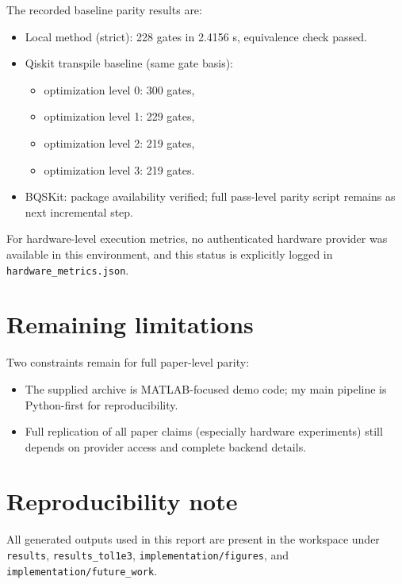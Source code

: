 \documentclass[11pt,a4paper]{article}
\begin{document}
The recorded baseline parity results are:
\begin{itemize}
    \item Local method (strict): 228 gates in 2.4156 s, equivalence check passed.
    \item Qiskit transpile baseline (same gate basis):
    \begin{itemize}
        \item optimization level 0: 300 gates,
        \item optimization level 1: 229 gates,
        \item optimization level 2: 219 gates,
        \item optimization level 3: 219 gates.
    \end{itemize}
    \item BQSKit: package availability verified; full pass-level parity script remains as next incremental step.
\end{itemize}

For hardware-level execution metrics, no authenticated hardware provider was available in this environment, and this status is explicitly logged in \texttt{hardware\_metrics.json}.

\section{Remaining limitations}
Two constraints remain for full paper-level parity:
\begin{itemize}
    \item The supplied archive is MATLAB-focused demo code; my main pipeline is Python-first for reproducibility.
    \item Full replication of all paper claims (especially hardware experiments) still depends on provider access and complete backend details.
\end{itemize}

\section*{Reproducibility note}
All generated outputs used in this report are present in the workspace under \texttt{results}, \texttt{results\_tol1e3}, \texttt{implementation/figures}, and \texttt{implementation/future\_work}.
\end{document}
